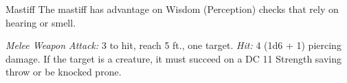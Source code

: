 \documentclass[10pt,a4paper,twoside,bg=print,twocolumn,openany,nodeprecatedcode]{dndbook}
\begin{document}
\begin{DndMonster}[float=t]{Mastiff}
\DndMonsterBasics[
armor-class = {12},
hit-points = {\DndDice{1d8 + 1}},
speed = {40 ft.}
]
\DndMonsterAbilityScores[
 str = 13,
 dex = 14,
 con = 12,
 int = 3,
 wis = 12,
 cha = 7
]
\DndMonsterDetails[
skills = {Perception +3},
challenge = 1/8,
]
The mastiff has advantage on Wisdom (Perception) checks that rely on hearing or smell.

\textsl{Melee Weapon Attack:} 3 to hit, reach 5 ft., one target. \textsl{Hit:} 4 (1d6 + 1) piercing damage. If the target is a creature, it must succeed on a DC 11 Strength saving throw or be knocked prone.

\end{DndMonster}
\end{document}
